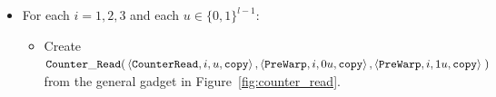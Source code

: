 \begin{itemize}
    \item For each $i = 1,2,3$ and each $u \in \{0, 1\}^{l-1}$:

    \begin{itemize}
        \item Create $\begin{aligned}[t]
            {\tt Counter\_Read}(& \left\langle {\tt CounterRead}, i,  u, {\tt copy} \right\rangle,
                     \left\langle {\tt PreWarp},     i, 0u, {\tt copy} \right\rangle,
                     \left\langle {\tt PreWarp},     i, 1u, {\tt copy} \right\rangle \;)
        \end{aligned}$\\from the general gadget in Figure~\ref{fig:counter_read}.
    \end{itemize}



\end{itemize}
